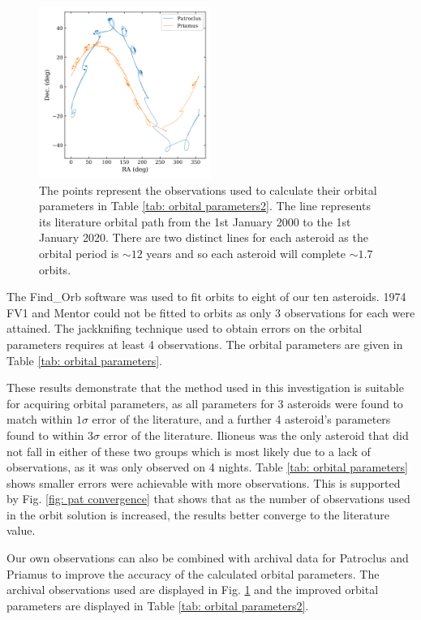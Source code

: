 \documentclass[10pt, twocolumn]{revtex4}    %
\begin{document}
\begin{figure}[h!]
\centering
\includegraphics[width=0.5\textwidth]{20180402_171730_OBSERVATIONS_MAP}
\caption{The points represent the observations used to calculate their orbital parameters in Table \ref{tab: orbital parameters2}. The line represents its literature orbital path from the 1st January 2000 to the 1st January 2020. There are two distinct lines for each asteroid as the orbital period is ${\sim}12$ years and so each asteroid will complete ${\sim}1.7$ orbits.}
\label{fig: observations2}
\end{figure}

The Find\_Orb software was used to fit orbits to eight of our ten asteroids. 1974 FV1 and Mentor could not be fitted to orbits as only $3$ observations for each were attained. The jackknifing technique used to obtain errors on the orbital parameters requires at least 4 observations. The orbital parameters are given in Table \ref{tab: orbital parameters}.

These results demonstrate that the method used in this investigation is suitable for acquiring orbital parameters, as all parameters for 3 asteroids were found to match within $1\sigma$ error of the literature, and a further 4 asteroid's parameters found to within $3\sigma$ error of the literature. Ilioneus was the only asteroid that did not fall in either of these two groups which is most likely due to a lack of observations, as it was only observed on 4 nights. Table \ref{tab: orbital parameters} shows smaller errors were achievable with more observations. This is supported by Fig. \ref{fig: pat convergence} that shows that as the number of observations used in the orbit solution is increased, the results better converge to the literature value.

Our own observations can also be combined with archival data for Patroclus and Priamus to improve the accuracy of the calculated orbital parameters. The archival observations used are displayed in Fig. \ref{fig: observations2} and the improved orbital parameters are displayed in Table \ref{tab: orbital parameters2}.
\end{document}
